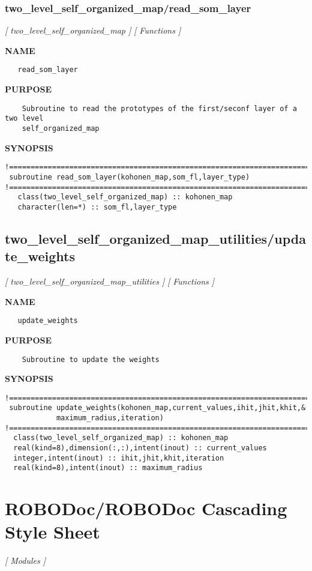\documentclass{article}
\begin{document}
\subsubsection{two\_level\_self\_organized\_map/read\_som\_layer}
\textsl{[ two\_level\_self\_organized\_map ]}
\textsl{[ Functions ]}

\label{ch:robo61}
\label{ch:two_level_self_organized_map_read_som_layer}
\textbf{NAME}
\begin{verbatim}
   read_som_layer
\end{verbatim}
\textbf{PURPOSE}
\begin{verbatim}
    Subroutine to read the prototypes of the first/seconf layer of a two level 
    self_organized_map 
\end{verbatim}
\textbf{SYNOPSIS}
\begin{verbatim}
!========================================================================================
 subroutine read_som_layer(kohonen_map,som_fl,layer_type)
!========================================================================================
   class(two_level_self_organized_map) :: kohonen_map
   character(len=*) :: som_fl,layer_type
\end{verbatim}
\newpage
\subsection{two\_level\_self\_organized\_map\_utilities/update\_weights}
\textsl{[ two\_level\_self\_organized\_map\_utilities ]}
\textsl{[ Functions ]}

\label{ch:robo82}
\label{ch:two_level_self_organized_map_utilities_update_weights}
\textbf{NAME}
\begin{verbatim}
   update_weights
\end{verbatim}
\textbf{PURPOSE}
\begin{verbatim}
    Subroutine to update the weights   
\end{verbatim}
\textbf{SYNOPSIS}
\begin{verbatim}
!========================================================================================
 subroutine update_weights(kohonen_map,current_values,ihit,jhit,khit,&
            maximum_radius,iteration) 
!========================================================================================
  class(two_level_self_organized_map) :: kohonen_map
  real(kind=8),dimension(:,:),intent(inout) :: current_values
  integer,intent(inout) :: ihit,jhit,khit,iteration
  real(kind=8),intent(inout) :: maximum_radius
\end{verbatim}
\newpage
\section{ROBODoc/ROBODoc Cascading Style Sheet}
\textsl{[ Modules ]}

\label{ch:robo9}
\label{ch:ROBODoc_ROBODoc_Cascading_Style_Sheet}
\printindex
\end{document}
